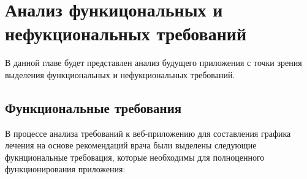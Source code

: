 \chapter{Анализ функицональных и нефукциональных требований}
    В данной главе будет представлен анализ будущего приложения %
    с точки зрения выделения функциональных и нефукциональных требований.
    \section{Функциональные требования}
        В процессе анализа требований к веб-приложению для %
        составления графика лечения на основе рекомендаций врача были выделены %
        следующие фукнциональные требовация, которые необходимы для полноценного %
        функционирования приложения:
        \newline
